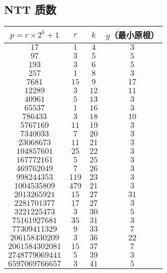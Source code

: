 \documentclass[12pt]{ctexart}
\begin{document}
\subsection{NTT 质数}

\begin{tabular}{c|c|c|c}
	$p=r\times 2^k+1$   &  $r$  & $k$  & $g$（最小原根）\\
 \hline
		  $17$          &  $1$  & $4$  &  $3$  \\
		  $97$          &  $3$  & $5$  &  $5$  \\
		  $193$         &  $3$  & $6$  &  $5$  \\
		  $257$         &  $1$  & $8$  &  $3$  \\
		 $7681$         & $15$  & $9$  & $17$  \\
		 $12289$        &  $3$  & $12$ & $11$  \\
		 $40961$        &  $5$  & $13$ &  $3$  \\
		 $65537$        &  $1$  & $16$ &  $3$  \\
		$786433$        &  $3$  & $18$ & $10$  \\
		$5767169$       & $11$  & $19$ &  $3$  \\
		$7340033$       &  $7$  & $20$ &  $3$  \\
	   $23068673$       & $11$  & $21$ &  $3$  \\
	   $104857601$      & $25$  & $22$ &  $3$  \\
	   $167772161$      &  $5$  & $25$ &  $3$  \\
	   $469762049$      &  $7$  & $26$ &  $3$  \\
	   $998244353$      & $119$ & $23$ &  $3$  \\
	  $1004535809$      & $479$ & $21$ &  $3$  \\
	  $2013265921$      & $15$  & $27$ & $31$  \\
	  $2281701377$      & $17$  & $27$ &  $3$  \\
	  $3221225473$      &  $3$  & $30$ &  $5$  \\
	  $75161927681$     & $35$  & $31$ &  $3$  \\
	  $77309411329$     &  $9$  & $33$ &  $7$  \\
	 $206158430209$     &  $3$  & $36$ & $22$  \\
	 $2061584302081$    & $15$  & $37$ &  $7$  \\
	 $2748779069441$    &  $5$  & $39$ &  $3$  \\
	 $6597069766657$    &  $3$  & $41$ &  $5$  \\

\end{tabular}
\end{document}
